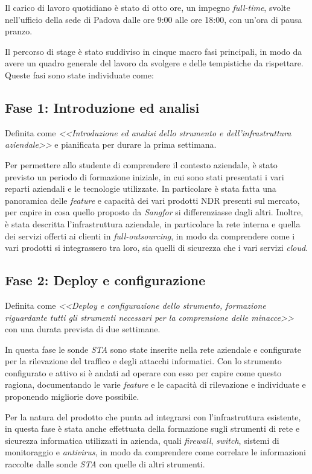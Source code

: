 Il carico di lavoro quotidiano è stato di otto ore, un impegno \emph{full-time}, svolte nell'ufficio della sede di Padova dalle ore 9:00 alle ore 18:00, con un'ora di pausa pranzo.

Il percorso di stage è stato suddiviso in cinque macro fasi principali, in modo da avere un quadro generale del lavoro da svolgere e delle tempistiche da rispettare. Queste fasi sono state individuate come:

\subsection{Fase 1: Introduzione ed analisi}

Definita come \emph{<<Introduzione ed analisi dello strumento e dell'infrastruttura aziendale>>} e pianificata per durare la prima settimana.

Per permettere allo studente di comprendere il contesto aziendale, è stato previsto un periodo di formazione iniziale, in cui sono stati presentati i vari reparti aziendali e le tecnologie utilizzate. In particolare è stata fatta una panoramica delle \emph{feature} e capacità dei vari prodotti NDR presenti sul mercato, per capire in cosa quello proposto da \emph{Sangfor} si differenziasse dagli altri. Inoltre, è stata descritta l'infrastruttura aziendale, in particolare la rete interna e quella dei servizi offerti ai clienti in \emph{full-outsourcing}, in modo da comprendere come i vari prodotti si integrassero tra loro, sia quelli di sicurezza che i vari servizi \emph{cloud}.

\subsection{Fase 2: Deploy e configurazione}

Definita come \emph{<<Deploy e configurazione dello strumento, formazione riguardante tutti gli strumenti necessari per la comprensione delle minacce>>} con una durata prevista di due settimane.

In questa fase le sonde \emph{STA} sono state inserite nella rete aziendale e configurate per la rilevazione del traffico e degli attacchi informatici. Con lo strumento configurato e attivo si è andati ad operare con esso per capire come questo ragiona, documentando le varie \emph{feature} e le capacità di rilevazione e individuate e proponendo migliorie dove possibile.

Per la natura del prodotto che punta ad integrarsi con l'infrastruttura esistente, in questa fase è stata anche effettuata della formazione sugli strumenti di rete e sicurezza informatica utilizzati in azienda, quali \emph{firewall}, \emph{switch}, sistemi di monitoraggio e \emph{antivirus}, in modo da comprendere come correlare le informazioni raccolte dalle sonde \emph{STA} con quelle di altri strumenti.

